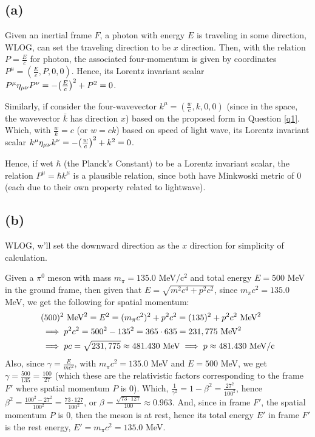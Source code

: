 \documentclass{article}
\DeclarePairedDelimiter{\paran}{(}{)}%
\begin{document}
\subsection*{(a)}
Given an inertial frame $F$, a photon with energy $E$ is traveling in some direction, WLOG, can set the traveling direction to be $x$ direction. Then, with the relation $P = \frac{E}{c}$ for photon, the associated four-momentum is given by coordinates $P^\mu = (\frac{E}{c}, P,0,0)$. Hence, its Lorentz invariant scalar $P^\mu\eta_{\mu\nu}P^\nu = -\paran*{\frac{E}{c}}^2+P^2 = 0$.

Similarly, if consider the four-wavevector $k^\mu = (\frac{w}{c},k,0,0)$ (since in the space, the wavevector $\bar{k}$ has direction $\hat{x}$) based on the proposed form in Question \ref{q1}. Which, with $\frac{w}{k}=c$ (or $w=ck$) based on speed of light wave, its Lorentz invariant scalar $k^\mu\eta_{\mu\nu}k^\nu = -\paran*{\frac{w}{c}}^2+k^2 = 0$.

Hence, if wet $\hbar$ (the Planck's Constant) to be a Lorentz invariant scalar, the relation $P^\mu = \hbar k^\mu$ is a plausible relation, since both have Minkwoski metric of $0$ (each due to their own property related to lightwave).

\subsection*{(b)}
WLOG, w'll set the downward direction as the $x$ direction for simplicity of calculation.

Given a $\pi^0$ meson with mass $m_\pi = 135.0$ MeV/c$^2$ and total energy $E=500$ MeV in the ground frame, then given that $E=\sqrt{m^2c^4 + p^2c^2}$, since $m_\pi c^2 = 135.0$ MeV, we get the following for spatial momentum:
\begin{align}
    &(500)^2 \textmd{ MeV}^2= E^2 = (m_\pi c^2)^2 + p^2c^2 =(135)^2 + p^2c^2 \textmd{ MeV}^2\\
    &\implies p^2c^2 = 500^2 - 135^2 = 365\cdot 635 = 231,775 \textmd{ MeV}^2\\
    &\implies pc = \sqrt{231,775}\approx 481.430 \textmd{ MeV}\implies p \approx 481.430 \textmd{ MeV/c}
\end{align}
Also, since $\gamma = \frac{E}{mc^2}$, with $m_\pi c^2 = 135.0$ MeV and $E = 500$ MeV, we get $\gamma = \frac{500}{135} = \frac{100}{27}$ (which these are the relativistic factors corresponding to the frame $F'$ where spatial momentum $P$ is $0$). Which, $\frac{1}{\gamma^2} = 1-\beta^2 = \frac{27^2}{100^2}$, hence $\beta^2 = \frac{100^2-27^2}{100^2} = \frac{73\cdot 127}{100^2}$, or $\beta =\frac{\sqrt{73\cdot 127}}{100}\approx 0.963$. And, since in frame $F'$, the spatial momentum $P$ is $0$, then the meson is at rest, hence its total energy $E'$ in frame $F'$ is the rest energy, $E' = m_\pi c^2 = 135.0$ MeV.
\end{document}
